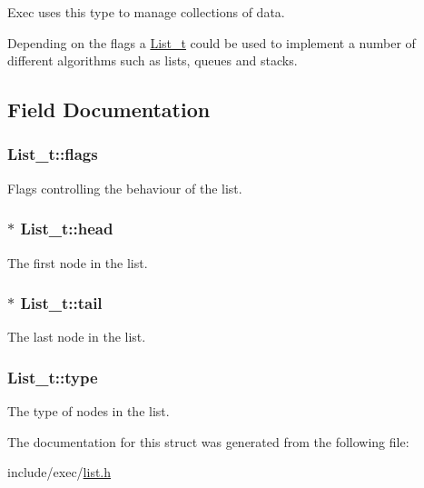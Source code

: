Exec uses this type to manage collections of data.

Depending on the flags a \hyperlink{structList__t}{List\+\_\+t} could be used to implement a number of different algorithms such as lists, queues and stacks. 

\subsection{Field Documentation}
\hypertarget{structList__t_ae857c80ff9476653e6f79af7a600754c}{
\subsubsection[{flags}]{ List\+\_\+t\+::flags}}\label{structList__t_ae857c80ff9476653e6f79af7a600754c}


Flags controlling the behaviour of the list. 

\hypertarget{structList__t_a4cd0a86bd26d4f568bcf2706a7a5af12}{
\subsubsection[{head}]{$\ast$ List\+\_\+t\+::head}}\label{structList__t_a4cd0a86bd26d4f568bcf2706a7a5af12}


The first node in the list. 

\hypertarget{structList__t_a62a0961fe562cfb46a057cc59a3acb80}{
\subsubsection[{tail}]{$\ast$ List\+\_\+t\+::tail}}\label{structList__t_a62a0961fe562cfb46a057cc59a3acb80}


The last node in the list. 

\hypertarget{structList__t_ad61b5ec1119556c7ef7f11971ac3f627}{
\subsubsection[{type}]{ List\+\_\+t\+::type}}\label{structList__t_ad61b5ec1119556c7ef7f11971ac3f627}


The type of nodes in the list. 



The documentation for this struct was generated from the following file\+:\begin{DoxyCompactItemize}
\item 
include/exec/\hyperlink{list_8h}{list.\+h}\end{DoxyCompactItemize}
